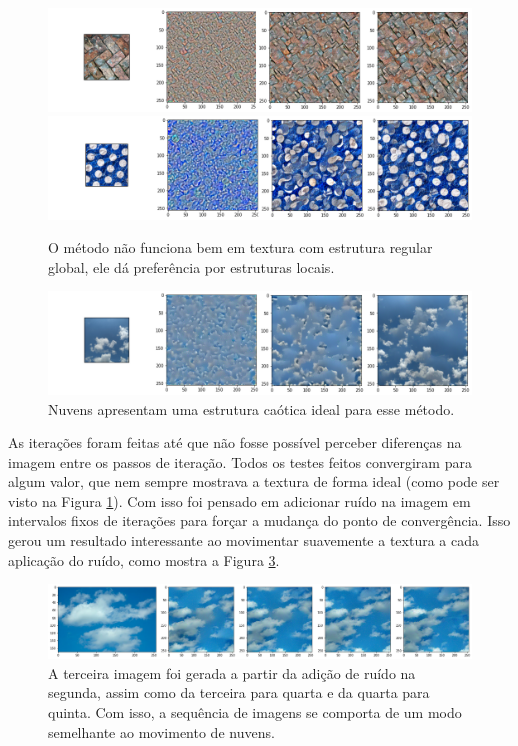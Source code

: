 \begin{figure}[!ht]
	\centering
	\includegraphics[width=\linewidth]{files/assets/results/result1.png}
	\includegraphics[width=\linewidth]{files/assets/results/result3.png}
	\caption{O método não funciona bem em textura com 
	estrutura regular global, ele dá preferência por
	estruturas locais. }
	\label{img:presente}
\end{figure}



\begin{figure}[!ht]
	\centering
	\includegraphics[width=\linewidth]{files/assets/results/result4.png}
	\caption{Nuvens apresentam uma estrutura caótica
	ideal para esse método.}
	\label{nuuv}
\end{figure}

\newpage
As iterações foram feitas até que não fosse possível perceber
diferenças na imagem entre os passos de iteração.
Todos os testes feitos convergiram para algum valor, que
nem sempre mostrava a textura de forma ideal (como pode
ser visto na Figura \ref{img:presente}).
Com isso foi pensado
em adicionar ruído na imagem em intervalos fixos de iterações
para forçar a mudança do ponto de convergência.
Isso gerou um resultado interessante ao movimentar
suavemente a textura a cada aplicação do ruído,
como mostra a Figura \ref{img:nuvem}.

\begin{figure}[!ht]
	\centering
	\includegraphics[width=\linewidth]{files/assets/results/result6.png}
	\caption{A terceira imagem foi gerada a partir da adição de ruído
		na segunda, assim como da terceira para quarta e da quarta para
		quinta. 
		Com isso, a sequência de imagens se comporta de um modo
		semelhante ao movimento de nuvens.}
	\label{img:nuvem}
\end{figure}

